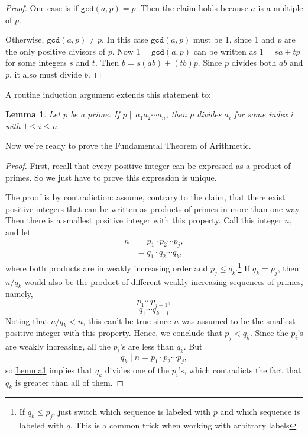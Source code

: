 \documentclass[11pt,oneside]{book}
\newtheorem{lem}[thm]{Lemma}
\theoremstyle{definition}
\begin{document}
\begin{proof}
    One case is if $\texttt{gcd}(a, p) = p$.
    Then the claim holds because $a$ is a multiple of $p$.

    Otherwise, $\texttt{gcd}(a, p) \neq p$.
    In this case $\texttt{gcd}(a, p)$ must be 1, since 1 and $p$ are the only positive divisors of $p$.
    Now $1 = \texttt{gcd}(a, p)$ can be written as $1 = sa + tp$ for some integers $s$ and $t$.
    Then $b = s(ab) + (tb)p$.
    Since $p$ divides both $ab$ and $p$, it also must divide $b$.
\end{proof}

A routine induction argument extends this statement to:

\begin{lem} \label{lem:PrimeDividesGeneralized}
    Let $p$ be a prime.
    If $p \mid\ a_{1}a_{2} \cdots a_{n}$, then $p$ divides $a_{i}$ for some index $i$ with $1 \leq i \leq n$.
\end{lem}

Now we're ready to prove the Fundamental Theorem of Arithmetic.

\begin{proof}
    First, recall that every positive integer can be expressed as a product of primes. So we just have to prove this expression is unique.

    The proof is by contradiction: assume, contrary to the claim, that there exist positive integers that can be written as products of primes in more than one way.
    Then there is a smallest positive integer with this property.
    Call this integer $n$, and let
    \begin{align*}
        n
        &= p_{1} \cdot p_{2} \cdots p_{j}, \\
        &= q_{1} \cdot q_{2} \cdots q_{k},
    \end{align*}
    where both products are in weakly increasing order and $p_{j} \leq q_{k}$.\footnote{
        If $q_{k} \leq p_{j}$, just switch which sequence is labeled with $p$ and which sequence is labeled with $q$.
        This is a common trick when working with arbitrary labels
    }
    If $q_{k} = p_{j}$, then $n/q_{k}$ would also be the product of different weakly increasing sequences of primes, namely,
    \[ p_{1} \cdots p_{j - 1}, \]
    \[ q_{1} \cdots q_{k - 1} \]
    Noting that $n/q_{k} < n$, this can't be true since $n$ was assumed to be the smallest positive integer with this property.
    Hence, we conclude that $p_{j} < q_{k}$.
    Since the $p_{i}$'s are weakly increasing, all the $p_{i}$'s are less than $q_{k}$.
    But
    \[ q_{k} \mid n = p_{1} \cdot p_{2} \cdots p_{j}, \]
    so \hyperref[lem:PrimeDividesGeneralized]{Lemma\ref*{lem:PrimeDividesGeneralized}} implies that $q_{k}$ divides one of the $p_{i}$'s, which contradicts the fact
    that $q_{k}$ is greater than all of them.
\end{proof}
\end{document}
